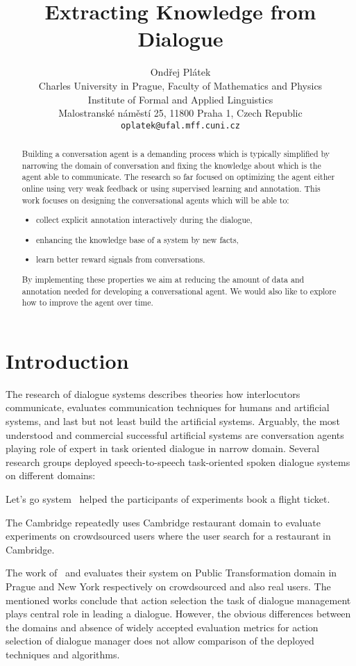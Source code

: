 \documentclass[11pt]{article}
\title{Extracting Knowledge from Dialogue}
\author{Ondřej Plátek \\
  Charles University in Prague, Faculty of Mathematics and Physics \\
  Institute of Formal and Applied Linguistics \\
  Malostranské náměstí 25, 11800 Praha 1, Czech Republic\\
  {\tt oplatek@ufal.mff.cuni.cz}\\}
\date{}
\begin{document}
\maketitle
\begin{abstract}
Building a conversation agent is a demanding process which is typically simplified by narrowing the domain of conversation and fixing the knowledge about which is the agent able to communicate.
The research so far focused on optimizing the agent either online using very weak feedback or using supervised learning and annotation.
This work focuses on designing the conversational agents which will be able to:
\begin{itemize}
    \item collect explicit annotation interactively during the dialogue,
    \item enhancing the knowledge base of a system by new facts,
    \item learn better reward signals from conversations.
\end{itemize}
By implementing these properties we aim at reducing the amount of data and annotation needed for developing a conversational agent.
We would also like to explore how to improve the agent over time.
\end{abstract}

\section{Introduction}
\label{sec:introduction}
The research of dialogue systems describes theories how interlocutors communicate, evaluates communication techniques for humans and artificial systems, and last but not least build the artificial systems.
Arguably, the most understood and commercial successful artificial systems are conversation agents playing role of expert in task oriented dialogue in narrow domain.
Several research groups deployed speech-to-speech task-oriented spoken dialogue systems on different domains:
    \item Let's go system~\cite{letsgo} helped the participants of experiments book a flight ticket.
    \item The Cambridge repeatedly uses Cambridge restaurant domain to evaluate experiments on crowdsourced users where the user search for a restaurant in Cambridge.
    \item The work of~\citep{Dusek} and \citep{Vejman} evaluates their system on Public Transformation domain in Prague and New York respectively on crowdsourced and also real users. 
The mentioned works conclude that action selection the task of dialogue management plays central role in leading a dialogue.
However, the obvious differences between the domains and absence of widely accepted evaluation metrics for action selection of dialogue manager does not allow comparison of the deployed techniques and algorithms.
\end{document}
